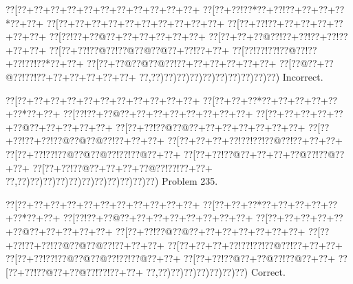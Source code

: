 \documentclass[a5paper]{article}
\begin{document}
\begin{center}
{\goo
\0??[\0??+\0??+\0??+\0??+\0??+\0??+\0??+\0??+\0??+\0??+\0??+
\0??[\0??+\0??!\0??*\0??+\0??!\0??+\0??+\0??+\0??*\0??+\0??+
\0??[\0??+\0??+\0??+\0??+\0??+\0??+\0??+\0??+\0??+\0??+
\0??[\0??+\0??!\0??+\0??+\0??+\0??+\0??+\0??+\0??+
\0??[\0??!\0??+\0??@\0??+\0??+\0??+\0??+\0??+\0??+
\0??[\0??+\0??+\0??@\0??!\0??+\0??!\0??+\0??!\0??+\0??+\0??+
\0??[\0??+\0??!\0??@\0??!\0??@\0??@\0??@\0??+\0??!\0??+\0??+
\0??[\0??!\0??!\0??!\0??@\0??!\0??+\0??!\0??!\0??*\0??+\0??+
\0??[\0??+\0??@\0??@\0??@\0??!\0??+\0??+\0??+\0??+\0??+\0??+
\0??[\0??@\0??+\0??@\0??!\0??!\0??+\0??+\0??+\0??+\0??+\0??+
\0??,\0??)\0??)\0??)\0??)\0??)\0??)\0??)\0??)\0??)\0??)
}
Incorrect. 

\end{center}
\newpage
\begin{center}
{\goo
\0??[\0??+\0??+\0??+\0??+\0??+\0??+\0??+\0??+\0??+\0??+\0??+
\0??[\0??+\0??+\0??*\0??+\0??+\0??+\0??+\0??+\0??*\0??+\0??+
\0??[\0??!\0??+\0??@\0??+\0??+\0??+\0??+\0??+\0??+\0??+\0??+
\0??[\0??+\0??+\0??+\0??+\0??+\0??@\0??+\0??+\0??+\0??+\0??+
\0??[\0??+\0??!\0??@\0??@\0??+\0??+\0??+\0??+\0??+\0??+\0??+
\0??[\0??+\0??!\0??+\0??!\0??@\0??@\0??@\0??!\0??+\0??+\0??+
\0??[\0??+\0??+\0??+\0??!\0??!\0??!\0??@\0??!\0??+\0??+\0??+
\0??[\0??+\0??!\0??!\0??@\0??@\0??@\0??!\0??!\0??@\0??+\0??+
\0??[\0??+\0??!\0??@\0??+\0??+\0??+\0??@\0??!\0??@\0??+\0??+
\0??[\0??+\0??!\0??@\0??+\0??+\0??+\0??@\0??!\0??!\0??+\0??+
\0??,\0??)\0??)\0??)\0??)\0??)\0??)\0??)\0??)\0??)\0??)\0??)
}
Problem 235.

\end{center}
\begin{center}
{\goo
\0??[\0??+\0??+\0??+\0??+\0??+\0??+\0??+\0??+\0??+\0??+\0??+
\0??[\0??+\0??+\0??*\0??+\0??+\0??+\0??+\0??+\0??*\0??+\0??+
\0??[\0??!\0??+\0??@\0??+\0??+\0??+\0??+\0??+\0??+\0??+\0??+
\0??[\0??+\0??+\0??+\0??+\0??+\0??@\0??+\0??+\0??+\0??+\0??+
\0??[\0??+\0??!\0??@\0??@\0??+\0??+\0??+\0??+\0??+\0??+\0??+
\0??[\0??+\0??!\0??+\0??!\0??@\0??@\0??@\0??!\0??+\0??+\0??+
\0??[\0??+\0??+\0??+\0??!\0??!\0??!\0??@\0??!\0??+\0??+\0??+
\0??[\0??+\0??!\0??!\0??@\0??@\0??@\0??!\0??!\0??@\0??+\0??+
\0??[\0??+\0??!\0??@\0??+\0??@\0??!\0??@\0??+\0??+
\0??[\0??+\0??!\0??@\0??+\0??@\0??!\0??!\0??+\0??+
\0??,\0??)\0??)\0??)\0??)\0??)\0??)\0??)
}
Correct. 

\end{center}
\end{document}
